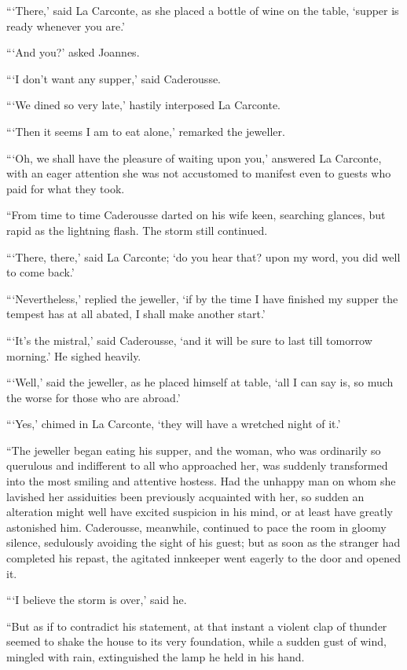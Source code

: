 “‘There,’ said La Carconte, as she placed a bottle of wine on the
table, ‘supper is ready whenever you are.’

“‘And you?’ asked Joannes.

“‘I don’t want any supper,’ said Caderousse.

“‘We dined so very late,’ hastily interposed La Carconte.

“‘Then it seems I am to eat alone,’ remarked the jeweller.

“‘Oh, we shall have the pleasure of waiting upon you,’ answered La
Carconte, with an eager attention she was not accustomed to manifest
even to guests who paid for what they took.

“From time to time Caderousse darted on his wife keen, searching
glances, but rapid as the lightning flash. The storm still continued.

“‘There, there,’ said La Carconte; ‘do you hear that? upon my word, you
did well to come back.’

“‘Nevertheless,’ replied the jeweller, ‘if by the time I have finished
my supper the tempest has at all abated, I shall make another start.’

“‘It’s the mistral,’ said Caderousse, ‘and it will be sure to last till
tomorrow morning.’ He sighed heavily.

“‘Well,’ said the jeweller, as he placed himself at table, ‘all I can
say is, so much the worse for those who are abroad.’

“‘Yes,’ chimed in La Carconte, ‘they will have a wretched night of it.’

“The jeweller began eating his supper, and the woman, who was
ordinarily so querulous and indifferent to all who approached her, was
suddenly transformed into the most smiling and attentive hostess. Had
the unhappy man on whom she lavished her assiduities been previously
acquainted with her, so sudden an alteration might well have excited
suspicion in his mind, or at least have greatly astonished him.
Caderousse, meanwhile, continued to pace the room in gloomy silence,
sedulously avoiding the sight of his guest; but as soon as the stranger
had completed his repast, the agitated innkeeper went eagerly to the
door and opened it.

“‘I believe the storm is over,’ said he.

“But as if to contradict his statement, at that instant a violent clap
of thunder seemed to shake the house to its very foundation, while a
sudden gust of wind, mingled with rain, extinguished the lamp he held
in his hand.


